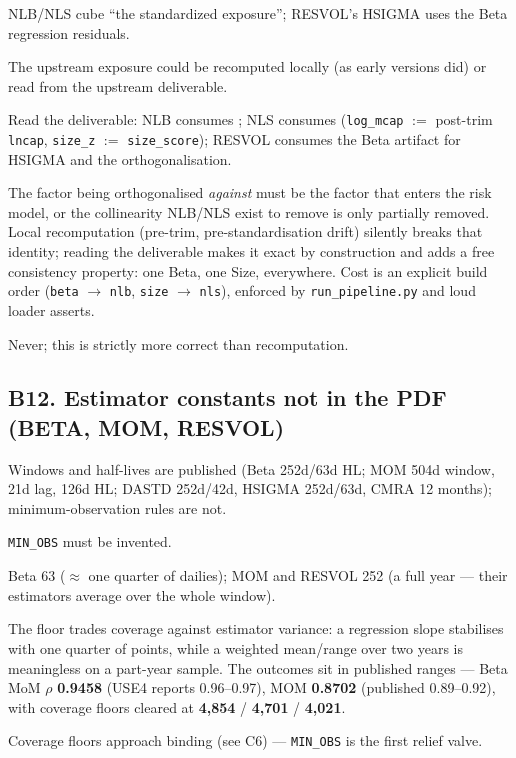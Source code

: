\documentclass[11pt,a4paper]{article}
\begin{document}
\begin{description}[style=nextline]
  \item[USE4] NLB/NLS cube ``the standardized exposure''; RESVOL's HSIGMA uses
    the Beta regression residuals.
  \item[Deviation] The upstream exposure could be recomputed locally (as early
    versions did) or read from the upstream deliverable.
  \item[Solution] Read the deliverable: NLB consumes
    ; NLS consumes 
    (\texttt{log\_mcap} $:=$ post-trim \texttt{lncap}, \texttt{size\_z} $:=$
    \texttt{size\_score}); RESVOL consumes the Beta artifact for HSIGMA and
    the orthogonalisation.
  \item[Validity] The factor being orthogonalised \emph{against} must be the
    factor that enters the risk model, or the collinearity NLB/NLS exist to
    remove is only partially removed. Local recomputation (pre-trim,
    pre-standardisation drift) silently breaks that identity; reading the
    deliverable makes it exact by construction and adds a free consistency
    property: one Beta, one Size, everywhere. Cost is an explicit build order
    (\texttt{beta} $\to$ \texttt{nlb}, \texttt{size} $\to$ \texttt{nls}),
    enforced by \texttt{run\_pipeline.py} and loud loader asserts.
  \item[Revisit when] Never; this is strictly more correct than recomputation.
\end{description}

\subsection{B12. Estimator constants not in the PDF (BETA, MOM, RESVOL)}

\begin{description}[style=nextline]
  \item[USE4] Windows and half-lives are published (Beta 252d/63d HL; MOM 504d
    window, 21d lag, 126d HL; DASTD 252d/42d, HSIGMA 252d/63d, CMRA 12
    months); minimum-observation rules are not.
  \item[Deviation] \texttt{MIN\_OBS} must be invented.
  \item[Solution] Beta 63 ($\approx$ one quarter of dailies); MOM and RESVOL
    252 (a full year --- their estimators average over the whole window).
  \item[Validity] The floor trades coverage against estimator variance: a
    regression slope stabilises with one quarter of points, while a weighted
    mean/range over two years is meaningless on a part-year sample. The
    outcomes sit in published ranges --- Beta MoM $\rho$ \textbf{0.9458}
    (USE4 reports 0.96--0.97), MOM \textbf{0.8702} (published 0.89--0.92),
    with coverage floors cleared at \textbf{4{,}854} / \textbf{4{,}701} /
    \textbf{4{,}021}.
  \item[Revisit when] Coverage floors approach binding (see C6) ---
    \texttt{MIN\_OBS} is the first relief valve.
\end{description}
\end{document}
